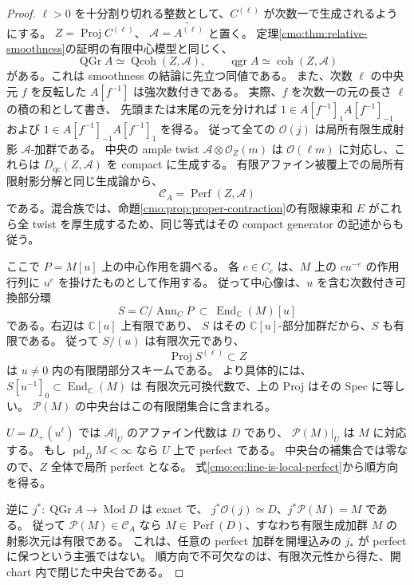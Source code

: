 \begin{proof}
$\ell>0$ を十分割り切れる整数として、$C^{(\ell)}$ が次数一で生成されるようにする。
$Z=\operatorname{Proj}C^{(\ell)}$、
$\mathcal A=\widetilde{A^{(\ell)}}$ と置く。
定理\ref{cmo:thm:relative-smoothness}の証明の有限中心模型と同じく、
\[
 \operatorname{QGr}A\simeq\operatorname{Qcoh}(Z,\mathcal A),\qquad
 \operatorname{qgr}A\simeq\operatorname{coh}(Z,\mathcal A)
\]
がある。これは smoothness の結論に先立つ同値である。
また、次数 $\ell$ の中央元 $f$ を反転した $A[f^{-1}]$ は強次数付きである。
実際、$f$ を次数一の元の長さ $\ell$ の積の和として書き、
先頭または末尾の元を分ければ
$1\in A[f^{-1}]_1A[f^{-1}]_{-1}$ および
$1\in A[f^{-1}]_{-1}A[f^{-1}]_1$ を得る。
従って全ての $\mathcal O(j)$ は局所有限生成射影 $\mathcal A$-加群である。
中央の ample twist $\mathcal A\otimes\mathcal O_Z(m)$ は
$\mathcal O(\ell m)$ に対応し、これらは
$D_{\mathrm{qc}}(Z,\mathcal A)$ を compact に生成する。
有限アファイン被覆上での局所有限射影分解と同じ生成論から、
\begin{equation}\label{cmo:eq:line-is-local-perfect}
 \mathcal C_A=\operatorname{Perf}(Z,\mathcal A)
\end{equation}
である。混合族では、命題\ref{cmo:prop:proper-contraction}の有限線束和 $E$
がこれら全 twist を厚生成するため、同じ等式はその compact generator
の記述からも従う。

ここで $P=M[u]$ 上の中心作用を調べる。
各 $c\in C_e$ は、$M$ 上の $cu^{-e}$ の作用行列に $u^e$ を掛けたものとして作用する。
従って中心像は、$u$ を含む次数付き可換部分環
\[
 S=C/\operatorname{Ann}_C P
 \ \subset\ \operatorname{End}_{\mathbb C}(M)[u]
\]
である。右辺は $\mathbb C[u]$ 上有限であり、
$S$ はその $\mathbb C[u]$-部分加群だから、$S$ も有限である。
従って $S/(u)$ は有限次元であり、
\[
 \operatorname{Proj}S^{(\ell)}\subset Z
\]
は $u\ne0$ 内の有限閉部分スキームである。
より具体的には、$S[u^{-1}]_0\subset\operatorname{End}_{\mathbb C}(M)$ は
有限次元可換代数で、上の Proj はその Spec に等しい。
$\mathcal P(M)$ の中央台はこの有限閉集合に含まれる。

$U=D_+(u^\ell)$ では $\mathcal A|_U$ のアファイン代数は $D$ であり、
$\mathcal P(M)|_U$ は $M$ に対応する。
もし $\operatorname{pd}_D M<\infty$ なら $U$ 上で perfect である。
中央台の補集合では零なので、$Z$ 全体で局所 perfect となる。
式\eqref{cmo:eq:line-is-local-perfect}から順方向を得る。

逆に $j^*:\operatorname{QGr}A\to\operatorname{Mod}D$ は exact で、
$j^*\mathcal O(j)\simeq D$、$j^*\mathcal P(M)=M$ である。
従って $\mathcal P(M)\in\mathcal C_A$ なら
$M\in\operatorname{Perf}(D)$、すなわち有限生成加群 $M$ の射影次元は有限である。
これは、任意の perfect 加群を開埋込みの $j_*$ が perfect に保つという主張ではない。
順方向で不可欠なのは、有限次元性から得た、開 chart 内で閉じた中央台である。
\end{proof}

